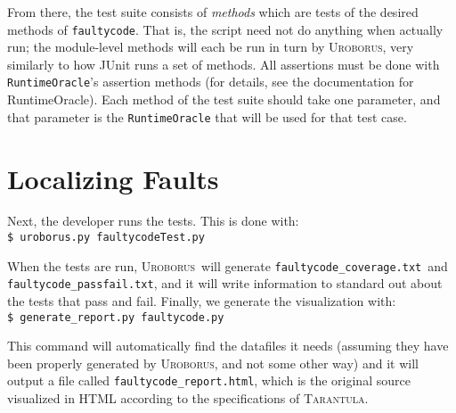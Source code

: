 \documentclass[english]{article}
\newcommand{\Uro}{\textsc{Uroborus}}
\newcommand{\Taran}{\textsc{Tarantula}}
\newcommand{\fc}{\texttt{faultycode}}
\newcommand{\fcp}{\texttt{faultycode.py}}
\newcommand{\fcT}{\texttt{faultycodeTest.py}}
\newcommand{\fcc}{\texttt{faultycode\_coverage.txt}}
\newcommand{\fcpf}{\texttt{faultycode\_passfail.txt}}
\newcommand{\fch}{\texttt{faultycode\_report.html}}
\begin{document}
From there, the test suite consists of \emph{methods} which are tests of the desired methods of \fc. 
That is, the script need not do anything when actually run; the module-level methods will each be
run in turn by \Uro, very similarly to how JUnit runs a set of methods.
All assertions must be
done with \texttt{RuntimeOracle}'s assertion methods (for details, see the documentation for RuntimeOracle).
Each method of the test suite should take one parameter, and that parameter is the
\texttt{RuntimeOracle} that will be used for that test case.

\section{Localizing Faults}

Next, the developer runs the tests. This is done with:\\
\texttt{\$ uroborus.py }\fcT

When the tests are run, \Uro\
will generate \fcc\ and \fcpf, and it will write information to standard out about the tests that
pass and fail. Finally, we generate the visualization with:\\
\texttt{\$ generate\_report.py }\fcp

This command will automatically find the datafiles it needs (assuming they have been properly
generated by \Uro, and not some other way) and it will output a file called \fch, which is 
the original source visualized in HTML
according to the specifications of \Taran.
\end{document}

